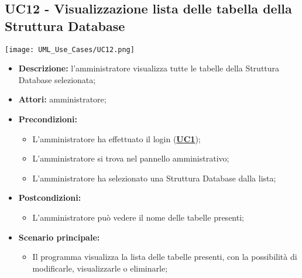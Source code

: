 \subsection{UC12 - Visualizzazione lista delle tabella della Struttura Database}
\label{sec:UC12}
\texttt{[image: UML\_Use\_Cases/UC12.png]}
\begin{itemize}
	\item \textbf{Descrizione:} l’amministratore visualizza tutte le tabelle della Struttura Database selezionata;
	\item \textbf{Attori:} amministratore;
	\item \textbf{Precondizioni:} 
	\begin{itemize}
		\item L’amministratore ha effettuato il login (\hyperref[sec:UC1]{\textbf{UC1}});
		\item L’amministratore si trova nel pannello amministrativo;
		\item L'amministratore ha selezionato una Struttura Database dalla lista;
	\end{itemize}
	\item \textbf{Postcondizioni:} 
	\begin{itemize}
		\item L'amministratore può vedere il nome delle tabelle presenti;
	\end{itemize}
	\item \textbf{Scenario principale:} 
	\begin{itemize}
		\item Il programma visualizza la lista delle tabelle presenti, con la possibilità di modificarle, visualizzarle o eliminarle;
	\end{itemize}
\end{itemize}

